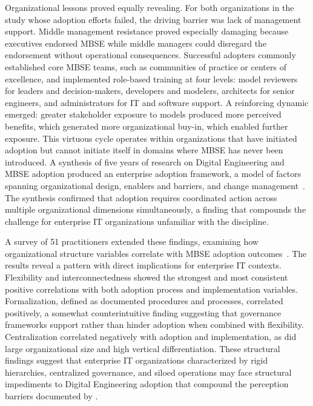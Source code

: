 Organizational lessons proved equally revealing. For both organizations in the study whose adoption efforts failed, the driving barrier was lack of management support. Middle management resistance proved especially damaging because executives endorsed MBSE while middle managers could disregard the endorsement without operational consequences. Successful adopters commonly established core MBSE teams, such as communities of practice or centers of excellence, and implemented role-based training at four levels: model reviewers for leaders and decision-makers, developers and modelers, architects for senior engineers, and administrators for IT and software support. A reinforcing dynamic emerged: greater stakeholder exposure to models produced more perceived benefits, which generated more organizational buy-in, which enabled further exposure. This virtuous cycle operates within organizations that have initiated adoption but cannot initiate itself in domains where MBSE has never been introduced. A synthesis of five years of research on Digital Engineering and MBSE adoption produced an enterprise adoption framework, a model of factors spanning organizational design, enablers and barriers, and change management~\parencite{McDermott_2024}. The synthesis confirmed that adoption requires coordinated action across multiple organizational dimensions simultaneously, a finding that compounds the challenge for enterprise IT organizations unfamiliar with the discipline.

A survey of 51 practitioners extended these findings, examining how organizational structure variables correlate with MBSE adoption outcomes~\parencite{Henderson_Salado_2024_Org}. The results reveal a pattern with direct implications for enterprise IT contexts. Flexibility and interconnectedness showed the strongest and most consistent positive correlations with both adoption process and implementation variables. Formalization, defined as documented procedures and processes, correlated positively, a somewhat counterintuitive finding suggesting that governance frameworks support rather than hinder adoption when combined with flexibility. Centralization correlated negatively with adoption and implementation, as did large organizational size and high vertical differentiation. These structural findings suggest that enterprise IT organizations characterized by rigid hierarchies, centralized governance, and siloed operations may face structural impediments to Digital Engineering adoption that compound the perception barriers documented by \citeauthor{Call_2024}.

